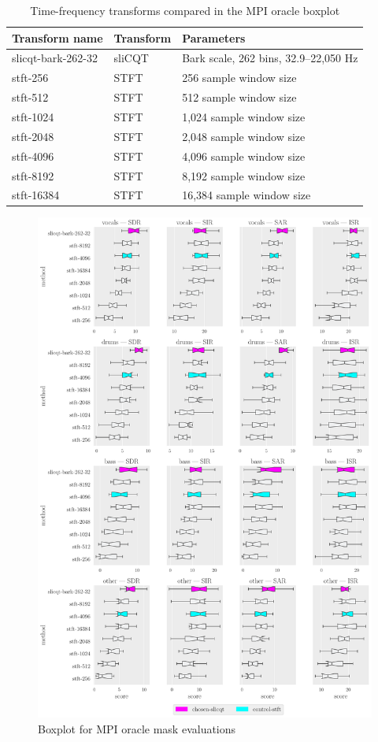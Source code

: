 \documentclass[report.tex]{subfiles}
\begin{document}
\begin{table}[ht]
	\centering
	\caption{Time-frequency transforms compared in the MPI oracle boxplot}
	\label{table:winsizes}
	\begin{tabular}{ |l|l|l| }
	 \hline
		Transform name & Transform & Parameters \\
	 \hline
	 \hline
		slicqt-bark-262-32 & sliCQT & Bark scale, 262 bins, 32.9--22,050 Hz \\
	 \hline
		stft-256 & STFT & 256 sample window size \\
	 \hline
		stft-512 & STFT & 512 sample window size \\
	 \hline
		stft-1024 & STFT & 1,024 sample window size \\
	 \hline
		stft-2048 & STFT & 2,048 sample window size \\
	 \hline
		stft-4096 & STFT & 4,096 sample window size \\
	 \hline
		stft-8192 & STFT & 8,192 sample window size \\
	 \hline
		stft-16384 & STFT & 16,384 sample window size \\
	 \hline
\end{tabular}
\end{table}

\begin{figure}[ht]
	\centering
	\includegraphics[width=\textwidth]{./images-bss/oracle_boxplot.pdf}
	\caption{Boxplot for MPI oracle mask evaluations}
	\label{fig:oraclebssboxplot}
\end{figure}
\end{document}
